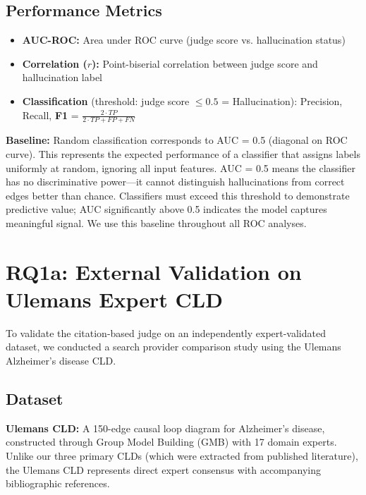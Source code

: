 \subsection{Performance Metrics}
\begin{itemize}[noitemsep]
    \item \textbf{AUC-ROC:} Area under ROC curve (judge score vs. hallucination status)
    \item \textbf{Correlation ($r$):} Point-biserial correlation between judge score and hallucination label
    \item \textbf{Classification} (threshold: judge score $\leq 0.5$ = Hallucination): Precision, Recall, \textbf{F1} = $\frac{2 \cdot TP}{2 \cdot TP + FP + FN}$
\end{itemize}

\textbf{Baseline:} Random classification corresponds to AUC = 0.5 (diagonal on ROC curve). This represents the expected performance of a classifier that assigns labels uniformly at random, ignoring all input features. AUC = 0.5 means the classifier has no discriminative power---it cannot distinguish hallucinations from correct edges better than chance. Classifiers must exceed this threshold to demonstrate predictive value; AUC significantly above 0.5 indicates the model captures meaningful signal. We use this baseline throughout all ROC analyses.

\section{RQ1a: External Validation on Ulemans Expert CLD}

To validate the citation-based judge on an independently expert-validated dataset, we conducted a search provider comparison study using the Ulemans Alzheimer's disease CLD.

\subsection{Dataset}

\textbf{Ulemans CLD:} A 150-edge causal loop diagram for Alzheimer's disease, constructed through Group Model Building (GMB) with 17 domain experts. Unlike our three primary CLDs (which were extracted from published literature), the Ulemans CLD represents direct expert consensus with accompanying bibliographic references.

